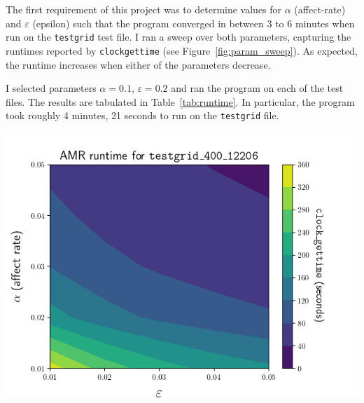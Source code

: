 \documentclass{article}
\begin{document}
The first requirement of this project was to determine values for $\alpha$
(affect-rate) and $\varepsilon$ (epsilon) such that the program converged in
between 3 to 6 minutes when run on the \texttt{testgrid} test file. I ran a sweep over both parameters,
capturing the runtimes reported by \texttt{clock\textunderscore gettime} (see
Figure~\ref{fig:param_sweep}). As expected, the runtime increases when either
of the parameters decrease.

I selected parameters $\alpha=0.1$, $\varepsilon=0.2$ and ran the program
on each of the test files. The results are tabulated in Table~\ref{tab:runtime}.
In particular, the program took roughly 4 minutes, 21 seconds to run on the
\texttt{testgrid} file.

\begin{minipage}{\linewidth}
    \centering
    \begin{minipage}{0.4\linewidth}

            \includegraphics[width=\linewidth]{../results/testgrid_400_12206_results.png}

            \label{fig:param_sweep}


\end{minipage}
\end{minipage}
\end{document}
